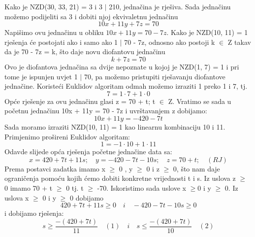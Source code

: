 \documentclass[12pt]{article}
\begin{document}
\begin{enumerate}
Kako je NZD(30, 33, 21) = 3 i 3 ${\mid}$ 210, jednačina je rješiva. Sada jednačinu
možemo podijeliti sa 3 i dobiti njoj ekvivaletnu jednačinu \\
\begin{equation*}
10x + 11y + 7z = 70
\end{equation*}
Napišimo ovu jednačinu u obliku ${10x + 11y = 70 - 7z}$. Kako je NZD(10, 11) =
1 rješenja će postojati ako i samo ako 1 ${\mid}$ 70 - 7z, odnosno ako postoji k ${\in}$ Z
takav da je 70 - 7z = k, što daje novu diofantovu jednačinu
\begin{equation*}
k + 7z = 70
\end{equation*}
Ovo je diofantova jednačina sa dvije nepoznate u kojoj je NZD(1, 7) = 1
i pri tome je ispunjen uvjet 1 ${\mid}$ 70, pa možemo pristupiti rješavanju diofantove
jednačine. Koristeći Euklidov algoritam odmah možemo izraziti 1 preko 1 i
7, tj.
\begin{equation*}
7 = 1 \cdot 7 + 1 \cdot 0
\end{equation*}
Opće rješenje za ovu jednačinu glasi z = 70 + t; t ${\in}$ Z. Vratimo se sada u
početnu jednačinu 10x + 11y = 70 - 7z i uvrštavanjem z dobijamo:
\begin{equation*}
10x + 11y = -420 - 7t
\end{equation*}
Sada moramo izraziti NZD(10, 11) = 1 kao linearnu kombinaciju 10 i 11.
Primjenimo prošireni Euklidov algoritam:
\begin{equation*}
1 = -1 \cdot 10 + 1 \cdot 11
\end{equation*}
Odavde slijede opća rješenja početne jednačine data sa:
\begin{equation*}
x = 420 + 7t + 11s;  \quad
y = -420 - 7t - 10s; \quad 
z = 70 + t; \quad (RJ)
\end{equation*}
Prema postavci zadatka imamo x ${\geq}$ 0 , y ${\geq}$ 0 i z ${\geq}$ 0, što nam daje
ograničenja pomoću kojih ćemo dobiti konkretne vrijednosti t i s. Iz uslova
z ${\geq}$ 0 imamo 70 + t ${\geq}$ 0  tj. t ${\geq}$ -70. 
Iskoristimo sada uslove x ${\geq}$0 i y ${\geq}$ 0. Iz uslova x ${\geq}$ 0 i y ${\geq}$ 0 dobijamo
\begin{equation*}
420 + 7t + 11s \geq 0 \quad  i  \quad
-420 - 7t - 10s \geq 0  
\end{equation*}
i dobijamo rješenja:
\begin{equation*}
s \geq \frac{-(420 + 7t)}{11} \quad (1) \quad i \quad s \leq \frac{-(420 + 7t)}{10} \quad (2)
\end{equation*}


\end{enumerate}
\end{document}
